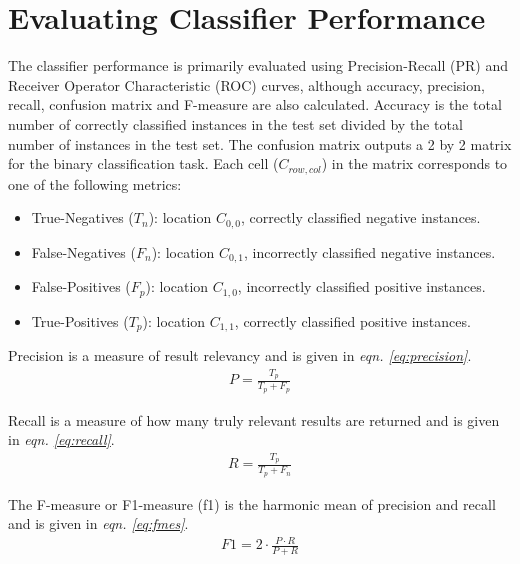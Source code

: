 \documentclass[ms]{nuthesis}
\begin{document}
\section{Evaluating Classifier Performance}
\par The classifier performance is primarily evaluated using Precision-Recall (PR) and Receiver Operator
Characteristic (ROC) curves, although accuracy, precision, recall, confusion matrix and  F-measure
are also calculated. Accuracy is the total number of correctly classified instances in the test set
divided by the total number of instances in the test set. The confusion matrix outputs a 2 by 2 matrix
for the binary classification task. Each cell ($C_{row,col}$) in the matrix corresponds to one of the
following metrics:
\begin{itemize}
  \item True-Negatives ($T_n$): location $C_{0,0}$, correctly classified negative instances.
  \item False-Negatives ($F_n$): location $C_{0,1}$, incorrectly classified negative instances.
  \item False-Positives ($F_p$): location $C_{1,0}$, incorrectly classified positive instances.
  \item True-Positives ($T_p$): location $C_{1,1}$, correctly classified positive instances.
\end{itemize}

Precision is a measure of result relevancy and is given in \textit{eqn. \ref{eq:precision}}.
\FloatBarrier
\begin{equation}
\label{eq:precision}
\begin{aligned}
P = \frac{T_p}{T_p+F_p}
\end{aligned}
\end{equation}
\FloatBarrier

Recall is a measure of how many truly relevant results are returned and is given in
\textit{eqn. \ref{eq:recall}}.
\FloatBarrier
\begin{equation}
\label{eq:recall}
\begin{aligned}
R = \frac{T_p}{T_p+F_n}
\end{aligned}
\end{equation}
\FloatBarrier

The F-measure or F1-measure (f1) is the harmonic mean of precision and recall and is given in
\textit{eqn. \ref{eq:fmes}}.
\FloatBarrier
\begin{equation}
\label{eq:fmes}
\begin{aligned}
F1 = 2\cdot \frac{P \cdot R}{P+R}
\end{aligned}
\end{equation}
\FloatBarrier
\end{document}

